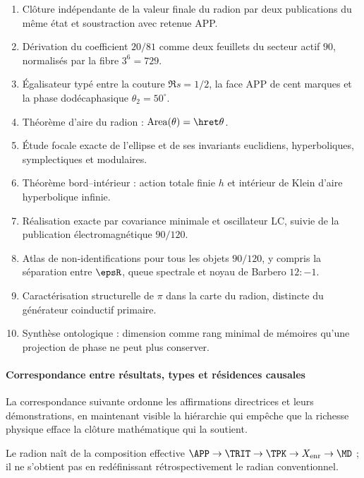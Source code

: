 \begin{enumerate}[label=\textbf{C\arabic*.}]
\item Clôture indépendante de la valeur finale du radion par deux publications du même état et
soustraction avec retenue APP.
\item Dérivation du coefficient \(20/81\) comme deux feuillets du secteur actif
\(90\), normalisés par la fibre \(3^6=729\).
\item Égalisateur typé entre la couture \(\Re s=1/2\), la face APP de cent
marques et la phase dodécaphasique \(\theta_2=50^\circ\).
\item Théorème d'aire du radion : \(\operatorname{Area}(\theta)=\hret\theta\).
\item Étude focale exacte de l'ellipse et de ses invariants euclidiens,
hyperboliques, symplectiques et modulaires.
\item Théorème bord--intérieur : action totale finie \(h\) et intérieur de Klein
d'aire hyperbolique infinie.
\item Réalisation exacte par covariance minimale et oscillateur LC, suivie de
la publication électromagnétique \(90/120\).
\item Atlas de non-identifications pour tous les objets \(90/120\), y compris
la séparation entre \(\epsR\), queue spectrale et noyau de Barbero \(12:-1\).
\item Caractérisation structurelle de \(\pi\) dans la carte du radion, distincte
du générateur coinductif primaire.
\item Synthèse ontologique : dimension comme rang minimal de mémoires qu'une
projection de phase ne peut plus conserver.
\end{enumerate}
\paragraph{Correspondance entre résultats, types et résidences causales}

La correspondance suivante ordonne les affirmations directrices et leurs démonstrations,
en maintenant visible la hiérarchie qui empêche que
la richesse physique efface la clôture mathématique qui la soutient.

\begin{exactbox}[title={Généalogie APP--TRIT--TPK du radion}]
Le radion naît de la composition effective
\(\APP\to\TRIT\to\TPK\to X_{\mathrm{enr}}\to\MD\) ; il ne s'obtient pas
en redéfinissant rétrospectivement le radian conventionnel.
\end{exactbox}

